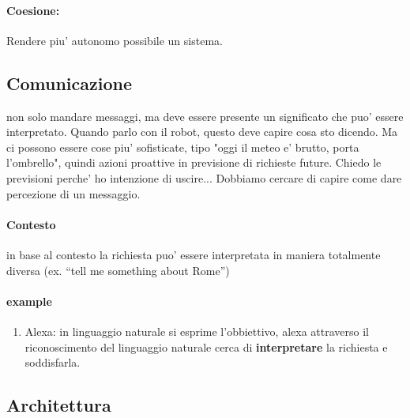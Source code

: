 \documentclass[11pt]{article}
\begin{document}
\paragraph{Coesione:} %
\label{par:coesione_}
Rendere piu' autonomo possibile un sistema.



\subsection{Comunicazione} %
non solo mandare messaggi, ma deve essere presente un significato che puo' essere interpretato.
Quando parlo con il robot, questo deve capire cosa sto dicendo. Ma ci possono essere cose piu' sofisticate, tipo "oggi il meteo e' brutto, porta l'ombrello", quindi azioni proattive in previsione di richieste future. Chiedo le previsioni perche' ho intenzione di uscire...
Dobbiamo cercare di capire come dare percezione di un messaggio.

\paragraph{Contesto} %
\label{par:contesto}
in base al contesto la richiesta puo' essere interpretata in maniera totalmente diversa (ex. ``tell me something about Rome'')



\paragraph{example} %
\label{par:example}
\begin{enumerate}
	\item Alexa: in linguaggio naturale si esprime l'obbiettivo, alexa attraverso il riconoscimento del linguaggio naturale cerca di \textbf{interpretare} la richiesta e soddisfarla.
\end{enumerate}

\subsection{Architettura} %
\label{sub:architettura}
\end{document}

